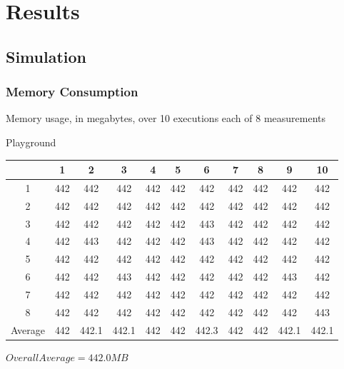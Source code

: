 \section{Results}

\subsection{Simulation}
\subsubsection{Memory Consumption}
\begin{center}
    Memory usage, in megabytes, over 10 executions each of 8 measurements

    Playground\\
    \begin{tabular}{ |c|c|c|c|c|c|c|c|c|c|c| }
        \hline
          & 1 & 2 & 3 & 4 & 5 & 6 & 7 & 8 & 9 & 10 \\
        \hline
        \hline
        1 & 442 & 442 & 442 & 442 & 442 & 442 & 442 & 442 & 442 & 442 \\
        2 & 442 & 442 & 442 & 442 & 442 & 442 & 442 & 442 & 442 & 442 \\
        3 & 442 & 442 & 442 & 442 & 442 & 443 & 442 & 442 & 442 & 442 \\
        4 & 442 & 443 & 442 & 442 & 442 & 443 & 442 & 442 & 442 & 442 \\
        5 & 442 & 442 & 442 & 442 & 442 & 442 & 442 & 442 & 442 & 442 \\
        6 & 442 & 442 & 443 & 442 & 442 & 442 & 442 & 442 & 443 & 442 \\
        7 & 442 & 442 & 442 & 442 & 442 & 442 & 442 & 442 & 442 & 442 \\
        8 & 442 & 442 & 442 & 442 & 442 & 442 & 442 & 442 & 442 & 443 \\
        \hline
        \hline
        Average & 442 & 442.1 & 442.1 & 442 & 442 & 442.3 & 442 & 442 & 442.1 & 442.1 \\
        \hline
    \end{tabular}
    $ Overall Average = 442.0 MB $


\end{center}
